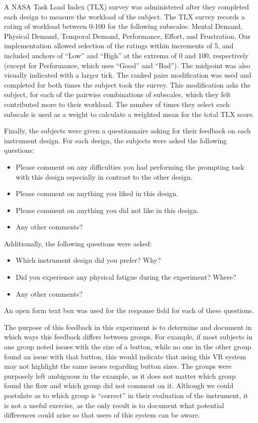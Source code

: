 A NASA Task Load Index (TLX) survey \citep{hart_development_1988} was administered after they completed each design to measure the workload of the subject.
The TLX survey records a rating of workload between 0-100 for the following subscales: Mental Demand, Physical Demand, Temporal Demand, Performance, Effort, and Frustration.
Our implementation allowed selection of the ratings within increments of 5, and included anchors of ``Low'' and ``High'' at the extrema of 0 and 100, respectively (except for Performance, which uses ``Good'' and ``Bad'').
The midpoint was also visually indicated with a larger tick.
The ranked pairs modification was used and completed for both times the subject took the survey.
This modification asks the subject, for each of the pairwise combinations of subscales, which they felt contributed more to their workload.
The number of times they select each subscale is used as a weight to calculate a weighted mean for the total TLX score.

Finally, the subjects were given a questionnaire asking for their feedback on each instrument design.
For each design, the subjects were asked the following questions:
\begin{itemize}
    \item Please comment on any difficulties you had performing the prompting task with this design especially in contrast to the other design.
    \item Please comment on anything you liked in this design.
    \item Please comment on anything you did not like in this design.
    \item Any other comments?
\end{itemize}
Additionally, the following questions were asked:
\begin{itemize}
    \item Which instrument design did you prefer? Why?
    \item Did you experience any physical fatigue during the experiment? Where?
    \item Any other comments?
\end{itemize}
An open form text box was used for the response field for each of these questions.

The purpose of this feedback in this experiment is to determine and document in which ways this feedback differs between groups.
For example, if most subjects in one group noted issues with the size of a button, while no one in the other group found an issue with that button, this would indicate that using this VR system may not highlight the same issues regarding button sizes.
The groups were purposely left ambiguous in the example, as it does not matter which group found the flaw and which group did not comment on it.
Although we could postulate as to which group is ``correct'' in their evaluation of the instrument, it is not a useful exercise, as the only result is to document what potential differences could arise so that users of this system can be aware.

